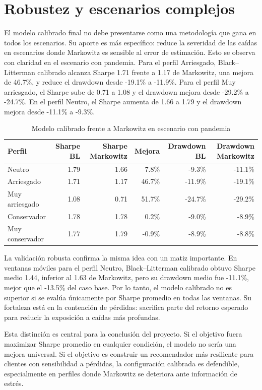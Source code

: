 \documentclass[11pt]{article}
\begin{document}
\section{Robustez y escenarios complejos}

El modelo calibrado final no debe presentarse como una metodolog\'ia que gana en todos los escenarios. Su aporte es m\'as espec\'ifico: reduce la severidad de las ca\'idas en escenarios donde Markowitz es sensible al error de estimaci\'on. Esto se observa con claridad en el escenario con pandemia. Para el perfil Arriesgado, Black--Litterman calibrado alcanza Sharpe 1.71 frente a 1.17 de Markowitz, una mejora de 46.7\%, y reduce el drawdown desde -19.1\% a -11.9\%. Para el perfil Muy arriesgado, el Sharpe sube de 0.71 a 1.08 y el drawdown mejora desde -29.2\% a -24.7\%. En el perfil Neutro, el Sharpe aumenta de 1.66 a 1.79 y el drawdown mejora desde -11.1\% a -9.3\%.

\begin{table}[H]
\centering
\caption{Modelo calibrado frente a Markowitz en escenario con pandemia}
\label{tab:pandemia}
\begin{tabular}{l r r r r r}
\toprule
Perfil & Sharpe BL & Sharpe Markowitz & Mejora & Drawdown BL & Drawdown Markowitz \\
\midrule
Neutro & 1.79 & 1.66 & 7.8\% & -9.3\% & -11.1\% \\
Arriesgado & 1.71 & 1.17 & 46.7\% & -11.9\% & -19.1\% \\
Muy arriesgado & 1.08 & 0.71 & 51.7\% & -24.7\% & -29.2\% \\
Conservador & 1.78 & 1.78 & 0.2\% & -9.0\% & -8.9\% \\
Muy conservador & 1.77 & 1.79 & -0.9\% & -8.9\% & -8.8\% \\
\bottomrule
\end{tabular}
\end{table}

La validaci\'on robusta confirma la misma idea con un matiz importante. En ventanas m\'oviles para el perfil Neutro, Black--Litterman calibrado obtuvo Sharpe medio 1.44, inferior al 1.63 de Markowitz, pero su drawdown medio fue -11.1\%, mejor que el -13.5\% del caso base. Por lo tanto, el modelo calibrado no es superior si se eval\'ua \'unicamente por Sharpe promedio en todas las ventanas. Su fortaleza est\'a en la contenci\'on de p\'erdidas: sacrifica parte del retorno esperado para reducir la exposici\'on a ca\'idas m\'as profundas.

Esta distinci\'on es central para la conclusi\'on del proyecto. Si el objetivo fuera maximizar Sharpe promedio en cualquier condici\'on, el modelo no ser\'ia una mejora universal. Si el objetivo es construir un recomendador m\'as resiliente para clientes con sensibilidad a p\'erdidas, la configuraci\'on calibrada es defendible, especialmente en perfiles donde Markowitz se deteriora ante informaci\'on de estr\'es.
\end{document}
